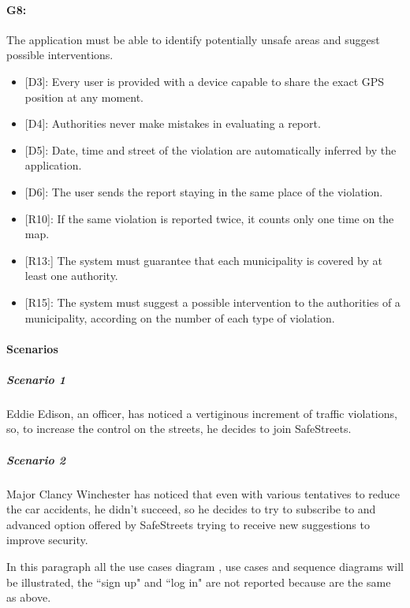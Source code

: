 \documentclass[12pt,a4paper]{report}
\begin{document}
			\paragraph {G8:} The application must be able to identify potentially unsafe areas and suggest possible interventions.
				\begin{itemize}
					\item{[D3]:} Every user is provided with a device capable to share the exact GPS position at any moment.
			 		\item{[D4]:} Authorities never make mistakes in evaluating a report.
					\item{[D5]:} Date, time and street of the violation are automatically inferred by the application.
			 		\item{[D6]:} The user sends the report staying in the same place of the violation.
				\end{itemize}
				\begin{itemize}
					\item{[R10]:} If the same violation is reported twice, it counts only one time on the map.
					\item{[R13:]} The system must guarantee that each municipality is covered by at least one authority.
					\item{[R15]:} The system must suggest a possible intervention to the authorities of a municipality, according on the number of each type of violation.
				\end{itemize}

\paragraph{Scenarios}
				\subparagraph{Scenario 1}
					Eddie Edison, an officer, has noticed a vertiginous increment of traffic violations, so, to increase the control
					on the streets, he decides to join SafeStreets.
					
				\subparagraph{Scenario 2}
					Major Clancy Winchester has noticed that even with various tentatives to reduce the car accidents, he didn't
					succeed, so he decides to try to subscribe to and advanced option offered by SafeStreets trying to receive
					new suggestions to improve security.
					
				In this paragraph all the use cases diagram , use cases and sequence diagrams will be illustrated, the ``sign up" and ``log in"
				are not reported because are the same as above.
\end{document}
